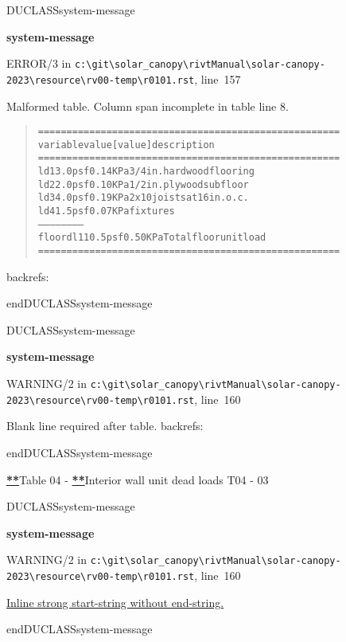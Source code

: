 \documentclass[12pt,notitle,letterpaper]{report}
\newenvironment{DUclass}[1]%
  {%
   \def\DocutilsClassFunctionName{DUCLASS#1}
     \csname \DocutilsClassFunctionName \endcsname}%
  {\csname end\DocutilsClassFunctionName \endcsname}%
\newenvironment{DUadmonition}%
  {\begin{center}
     \begin{lrbox}{\DUadmonitionbox}
       \begin{minipage}{0.9\linewidth}
  }%
  {    \end{minipage}
     \end{lrbox}
     \fbox{\usebox{\DUadmonitionbox}}
   \end{center}
  }
\providecommand*{\DUtitle}[1]{%
  \smallskip\noindent\textbf{#1}\smallskip}
\begin{document}
\begin{DUclass}{system-message}
\begin{DUadmonition}
\DUtitle{system-message
}

{\color{red}ERROR/3} in \texttt{c:\textbackslash{}git\textbackslash{}solar\_canopy\textbackslash{}rivtManual\textbackslash{}solar-canopy-2023\textbackslash{}resource\textbackslash{}rv00-temp\textbackslash{}r0101.rst}, line~157

Malformed table.
Column span incomplete in table line 8.

\begin{quote}
\begin{alltt}
==========  ========  =========  ==========================
variable       value    [value]  description
==========  ========  =========  ==========================
ld1          3.0 psf   0.14 KPa  3/4 in. hardwood flooring
ld2          2.0 psf   0.10 KPa  1/2 in. plywood subfloor
ld3          4.0 psf   0.19 KPa  2x10 joists at 16 in. o.c.
ld4          1.5 psf   0.07 KPa  fixtures
------        ------     ------  ------
floordl1    10.5 psf   0.50 KPa  Total floor unit load
==========  ========  =========  ==========================
\end{alltt}
\end{quote}
backrefs: \end{DUadmonition}
\end{DUclass}

\begin{DUclass}{system-message}
\begin{DUadmonition}
\DUtitle{system-message
}

{\color{red}WARNING/2} in \texttt{c:\textbackslash{}git\textbackslash{}solar\_canopy\textbackslash{}rivtManual\textbackslash{}solar-canopy-2023\textbackslash{}resource\textbackslash{}rv00-temp\textbackslash{}r0101.rst}, line~160

Blank line required after table.
backrefs: \end{DUadmonition}
\end{DUclass}

%
\hyperlink{system-message-9}{\textbf{\color{red}**}}Table 04 - %
\hyperlink{system-message-10}{\textbf{\color{red}**}}Interior wall unit dead loads \hfill T04 - 03

\begin{DUclass}{system-message}
\begin{DUadmonition}
\DUtitle{system-message
\raisebox{1em}{\hypertarget{system-message-9}{}}}

{\color{red}WARNING/2} in \texttt{c:\textbackslash{}git\textbackslash{}solar\_canopy\textbackslash{}rivtManual\textbackslash{}solar-canopy-2023\textbackslash{}resource\textbackslash{}rv00-temp\textbackslash{}r0101.rst}, line~160

\hyperlink{problematic-9}{
Inline strong start-string without end-string.
}\end{DUadmonition}
\end{DUclass}
\end{document}
